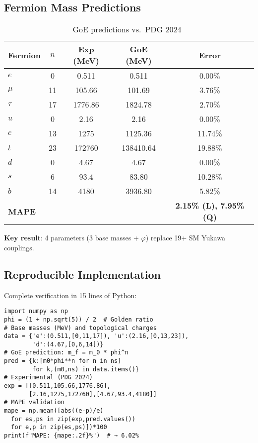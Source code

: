\documentclass[twocolumn,preprintnumbers,amsmath,amssymb,superscriptaddress]{revtex4-2}
\newcommand{\varphig}{\varphi}
\begin{document}
\subsection{Fermion Mass Predictions}

\begin{table}[h]
\caption{GoE predictions vs.\ PDG 2024~\cite{pdg2024}}
\label{tab:masses}
\begin{ruledtabular}
\begin{tabular}{lcccc}
Fermion & $n$ & Exp (MeV) & GoE (MeV) & Error \\
\hline
$e$ & 0 & 0.511 & 0.511 & 0.00\% \\
$\mu$ & 11 & 105.66 & 101.69 & 3.76\% \\
$\tau$ & 17 & 1776.86 & 1824.78 & 2.70\% \\
$u$ & 0 & 2.16 & 2.16 & 0.00\% \\
$c$ & 13 & 1275 & 1125.36 & 11.74\% \\
$t$ & 23 & 172760 & 138410.64 & 19.88\% \\
$d$ & 0 & 4.67 & 4.67 & 0.00\% \\
$s$ & 6 & 93.4 & 83.80 & 10.28\% \\
$b$ & 14 & 4180 & 3936.80 & 5.82\% \\
\hline
\textbf{MAPE} & & & & \textbf{2.15\% (L), 7.95\% (Q)} \\
\end{tabular}
\end{ruledtabular}
\end{table}

\textbf{Key result}: 4 parameters (3 base masses + $\varphig$) replace 19+ SM Yukawa couplings.

\subsection{Reproducible Implementation}

Complete verification in 15 lines of Python:
\begin{verbatim}
import numpy as np
phi = (1 + np.sqrt(5)) / 2  # Golden ratio
# Base masses (MeV) and topological charges
data = {'e':(0.511,[0,11,17]), 'u':(2.16,[0,13,23]),
        'd':(4.67,[0,6,14])}
# GoE prediction: m_f = m_0 * phi^n
pred = {k:[m0*phi**n for n in ns] 
        for k,(m0,ns) in data.items()}
# Experimental (PDG 2024)
exp = [[0.511,105.66,1776.86],
       [2.16,1275,172760],[4.67,93.4,4180]]
# MAPE validation
mape = np.mean([abs((e-p)/e) 
  for es,ps in zip(exp,pred.values()) 
  for e,p in zip(es,ps)])*100
print(f"MAPE: {mape:.2f}%")  # → 6.02%
\end{verbatim}
\end{document}
